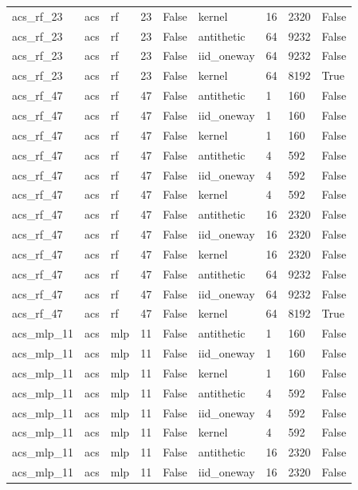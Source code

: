 \begin{tabular}{lllllllll}
acs\_rf\_23 & acs & rf & 23 & False & kernel & 16 & 2320 & False \\
acs\_rf\_23 & acs & rf & 23 & False & antithetic & 64 & 9232 & False \\
acs\_rf\_23 & acs & rf & 23 & False & iid\_oneway & 64 & 9232 & False \\
acs\_rf\_23 & acs & rf & 23 & False & kernel & 64 & 8192 & True \\
acs\_rf\_47 & acs & rf & 47 & False & antithetic & 1 & 160 & False \\
acs\_rf\_47 & acs & rf & 47 & False & iid\_oneway & 1 & 160 & False \\
acs\_rf\_47 & acs & rf & 47 & False & kernel & 1 & 160 & False \\
acs\_rf\_47 & acs & rf & 47 & False & antithetic & 4 & 592 & False \\
acs\_rf\_47 & acs & rf & 47 & False & iid\_oneway & 4 & 592 & False \\
acs\_rf\_47 & acs & rf & 47 & False & kernel & 4 & 592 & False \\
acs\_rf\_47 & acs & rf & 47 & False & antithetic & 16 & 2320 & False \\
acs\_rf\_47 & acs & rf & 47 & False & iid\_oneway & 16 & 2320 & False \\
acs\_rf\_47 & acs & rf & 47 & False & kernel & 16 & 2320 & False \\
acs\_rf\_47 & acs & rf & 47 & False & antithetic & 64 & 9232 & False \\
acs\_rf\_47 & acs & rf & 47 & False & iid\_oneway & 64 & 9232 & False \\
acs\_rf\_47 & acs & rf & 47 & False & kernel & 64 & 8192 & True \\
acs\_mlp\_11 & acs & mlp & 11 & False & antithetic & 1 & 160 & False \\
acs\_mlp\_11 & acs & mlp & 11 & False & iid\_oneway & 1 & 160 & False \\
acs\_mlp\_11 & acs & mlp & 11 & False & kernel & 1 & 160 & False \\
acs\_mlp\_11 & acs & mlp & 11 & False & antithetic & 4 & 592 & False \\
acs\_mlp\_11 & acs & mlp & 11 & False & iid\_oneway & 4 & 592 & False \\
acs\_mlp\_11 & acs & mlp & 11 & False & kernel & 4 & 592 & False \\
acs\_mlp\_11 & acs & mlp & 11 & False & antithetic & 16 & 2320 & False \\
acs\_mlp\_11 & acs & mlp & 11 & False & iid\_oneway & 16 & 2320 & False \\

\end{tabular}
